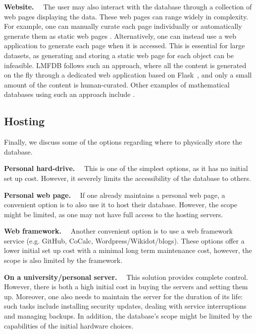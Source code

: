 \documentclass{amsart}
\newcommand{\subhead}[1]{\vspace{0.1in} \noindent \textbf{#1.}\ \ }
\begin{document}
\subhead{Website}
    The user may also interact with the database through a collection of web pages displaying the data.
    These web pages can range widely in complexity.
    For example, one can manually curate each page individually \cites{cantorsattic, fanosearch} or automatically generate them as static web pages \cites{etc, graphclasses, SyzygyData, knotinfo}.
    Alternatively, one can instead use a web application to generate each page when it is accessed.
    This is essential for large datasets, as generating and storing a static web page for each object can be infeasible.
    LMFDB follows such an approach, where all the content is generated on the fly through a dedicated web application based on Flask~\cite{flask}, and only a small amount of the content is human-curated.
    Other examples of mathematical databases using such an approach include \cites{knotatlas, hog}.

\subsection{Hosting}

Finally, we discuss some of the options regarding where to physically store the database.

\subhead{Personal hard-drive}
    This is one of the simplest options, as it has no initial set up cost.
    However, it severely limits the accessibility of the database to others.

\subhead{Personal web page}
    If one already maintains a personal web page, a convenient option is to also use it to host their database.
    However, the scope might be limited, as one may not have full access to the hosting servers.

\subhead{Web framework}
    Another convenient option is to use a web framework service (e.g. GitHub, CoCalc, Wordpress/Wikidot/blogs).
    These options offer a lower initial set up cost with a minimal long term maintenance cost, however, the scope is also limited by the framework.

\subhead{On a university/personal server}
    This solution provides complete control.
    However, there is both a high initial cost in buying the servers and setting them up.  Moreover, one also needs to maintain the server for the duration of its life: such tasks include installing security updates, dealing with service interruptions and managing backups.
    In addition, the database's scope might be limited by the capabilities of the initial hardware choices.
\end{document}
